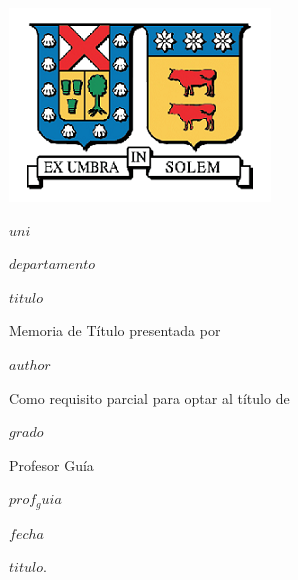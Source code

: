 \documentclass[$if(fontsize)$$fontsize$,$endif$$if(lang)$$babel-lang$,$endif$$if(papersize)$$papersize$paper,$endif$$for(classoption)$$classoption$$sep$,$endfor$]{$documentclass$}
\begin{document}
\begin{center}

\begin{center}
  \includegraphics{images/logo_new.png}
\end{center}


\large \textbf{$uni$}

\large \textbf{$departamento$}

\vspace{20mm}

\Large {\bf $titulo$}

\vspace{15mm}

\normalsize Memoria de Título presentada por

\large \textbf{$author$}

\vspace{15mm}

\normalsize Como requisito parcial para optar al título de

\textbf{$grado$}

\vspace{2.5mm}



\vspace{15mm}

Profesor Guía

$prof_guia$ %

\vspace{5mm}
$fecha$


\end{center}


\vspace{5mm}

\noindent $titulo$.

\vspace{5mm}

\end{document}
